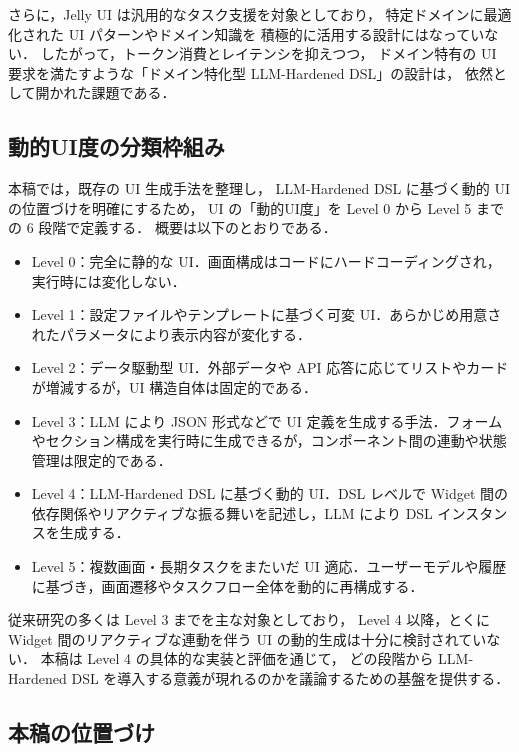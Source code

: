 \documentclass[a4paper,10pt]{jarticle}
\begin{document}
さらに，Jelly UI は汎用的なタスク支援を対象としており，
特定ドメインに最適化された UI パターンやドメイン知識を
積極的に活用する設計にはなっていない．
したがって，トークン消費とレイテンシを抑えつつ，
ドメイン特有の UI 要求を満たすような「ドメイン特化型 LLM-Hardened DSL」の設計は，
依然として開かれた課題である．



\subsection{動的UI度の分類枠組み}

本稿では，既存の UI 生成手法を整理し，
LLM-Hardened DSL に基づく動的 UI の位置づけを明確にするため，
UI の「動的UI度」を Level 0 から Level 5 までの 6 段階で定義する．
概要は以下のとおりである．

\begin{itemize}
  \item Level 0：完全に静的な UI．画面構成はコードにハードコーディングされ，実行時には変化しない．
  \item Level 1：設定ファイルやテンプレートに基づく可変 UI．あらかじめ用意されたパラメータにより表示内容が変化する．
  \item Level 2：データ駆動型 UI．外部データや API 応答に応じてリストやカードが増減するが，UI 構造自体は固定的である．
  \item Level 3：LLM により JSON 形式などで UI 定義を生成する手法．フォームやセクション構成を実行時に生成できるが，コンポーネント間の連動や状態管理は限定的である．
  \item Level 4：LLM-Hardened DSL に基づく動的 UI．DSL レベルで Widget 間の依存関係やリアクティブな振る舞いを記述し，LLM により DSL インスタンスを生成する．
  \item Level 5：複数画面・長期タスクをまたいだ UI 適応．ユーザーモデルや履歴に基づき，画面遷移やタスクフロー全体を動的に再構成する．
\end{itemize}

従来研究の多くは Level 3 までを主な対象としており，
Level 4 以降，とくに Widget 間のリアクティブな連動を伴う UI の動的生成は十分に検討されていない．
本稿は Level 4 の具体的な実装と評価を通じて，
どの段階から LLM-Hardened DSL を導入する意義が現れるのかを議論するための基盤を提供する．


\subsection{本稿の位置づけ}
\end{document}
